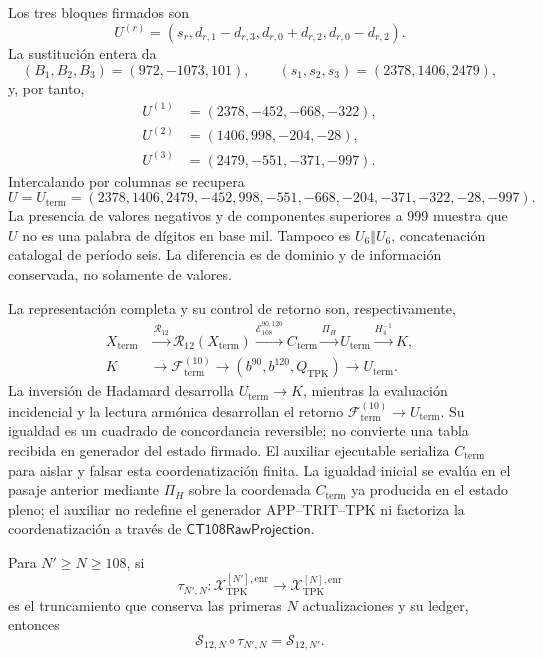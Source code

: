 Los tres bloques firmados son
\begin{equation}
 U^{(r)}=(s_r,d_{r,1}-d_{r,3},d_{r,0}+d_{r,2},d_{r,0}-d_{r,2}).
 \label{eq:k-bloques-firmados}
\end{equation}
La sustitución entera da
\[
 (B_1,B_2,B_3)=(972,-1073,101),\qquad
 (s_1,s_2,s_3)=(2378,1406,2479),
\]
y, por tanto,
\begin{align*}
 U^{(1)}&=(2378,-452,-668,-322),\\
 U^{(2)}&=(1406,998,-204,-28),\\
 U^{(3)}&=(2479,-551,-371,-997).
\end{align*}
Intercalando por columnas se recupera
\begin{equation}
 U=U_{\mathrm{term}}=(2378,1406,2479,-452,998,-551,
       -668,-204,-371,-322,-28,-997).
 \label{eq:k-u-firmado}
\end{equation}
La presencia de valores negativos y de componentes superiores a 999
muestra que \(U\) no es una palabra de dígitos en base mil. Tampoco es
\(U_6\Vert U_6\), concatenación catalogal de período seis. La diferencia
es de dominio y de información conservada, no solamente de valores.

La representación completa y su control de retorno son, respectivamente,
\[
\begin{aligned}
 X_{\mathrm{term}}
 &\xrightarrow{\mathcal R_{12}}
 \mathcal R_{12}(X_{\mathrm{term}})
 \xrightarrow{\mathcal E_{108}^{90,120}}
 C_{\mathrm{term}}
 \xrightarrow{\Pi_H}U_{\mathrm{term}}
 \xrightarrow{H_4^{-1}}K,\\
 K&\longrightarrow\mathscr F_{\mathrm{term}}^{(10)}
 \longrightarrow(b^{90},b^{120},Q_{\mathrm{TPK}})
 \longrightarrow U_{\mathrm{term}}.
\end{aligned}
\]
La inversión de Hadamard desarrolla \(U_{\mathrm{term}}\to K\), mientras la
evaluación incidencial y la lectura armónica desarrollan el retorno
\(\mathscr F_{\mathrm{term}}^{(10)}\to U_{\mathrm{term}}\). Su igualdad es
un cuadrado de concordancia reversible; no convierte una tabla recibida en
generador del estado firmado. El auxiliar ejecutable serializa
\(C_{\mathrm{term}}\) para aislar y falsar esta coordenatización finita. La igualdad
inicial se evalúa en el pasaje anterior mediante \(\Pi_H\) sobre la coordenada
\(C_{\mathrm{term}}\) ya producida en el estado pleno; el auxiliar no redefine
el generador APP--TRIT--TPK ni factoriza la coordenatización a través de
\(\mathsf{CT108RawProjection}\).

\begin{theorem}
\label{thm:k-naturalidad-lector-firmado}
Para \(N'\geq N\geq108\), si
\[
 \tau_{N',N}:
 \mathcal X_{\mathrm{TPK}}^{[N'],\mathrm{enr}}
 \longrightarrow
 \mathcal X_{\mathrm{TPK}}^{[N],\mathrm{enr}}
\]
es el truncamiento que conserva las primeras \(N\) actualizaciones y su
ledger, entonces
\[
 \mathcal S_{12,N}\circ\tau_{N',N}
 =\mathcal S_{12,N'}.
\]
\end{theorem}

